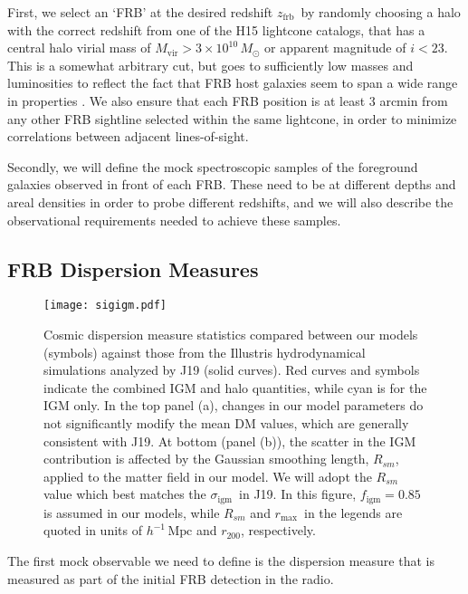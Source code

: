 \documentclass[twocolumn]{aastex63}
\newcommand{\dmhalo}{\ensuremath{\mathrm{DM}_\mathrm{halos}}}
\newcommand{\dmigm}{\ensuremath{\mathrm{DM}_\mathrm{igm}}}
\newcommand{\sigigm}{\ensuremath{\sigma_\mathrm{igm}}}
\newcommand{\figm}{\ensuremath{f_\mathrm{igm}}}
\newcommand{\zfrb}{\ensuremath{z_\mathrm{frb}}}
\newcommand{\hmpc}{\ensuremath{h^{-1}\,\mathrm{Mpc}}}
\newcommand{\rmax}{\ensuremath{r_\mathrm{max}}}
\begin{document}
\begin{CJK*}{UTF8}{gbsn}
First, we select an `FRB' at the desired redshift \zfrb\ by randomly choosing a halo with the correct redshift from one of the H15 lightcone catalogs,
that has a central halo virial mass of $M_\mathrm{vir} > 3 \times 10^{10}\,M_\odot$ or apparent magnitude of $i<23$. 
This is a somewhat arbitrary cut, but goes to sufficiently low masses and luminosities to reflect the fact that FRB host galaxies seem to span a wide range in properties \citep[e.g.][]{heintz:2020}.
We also ensure that each 
FRB position is at least 3 arcmin from any other FRB sightline selected within the same lightcone, 
in order to minimize correlations between adjacent lines-of-sight.

Secondly, we will define the mock spectroscopic samples of the foreground galaxies observed in front of each FRB.
These need to be at different depths and areal densities in order to probe different redshifts, and we will also describe the
observational requirements needed to achieve these samples.


\subsection{FRB Dispersion Measures}
\label{sec:dm_frb}

\begin{figure}
\texttt{[image: sigigm.pdf]}
\caption{\label{fig:sigigm}
Cosmic dispersion measure statistics compared between our models (symbols) against those from the Illustris hydrodynamical simulations analyzed by J19 (solid curves). Red curves and symbols indicate the combined IGM and halo quantities, while cyan is for the IGM only.
In the top panel (a), changes in our model parameters do not significantly modify the mean DM values, which are generally consistent with J19. 
At bottom (panel (b)), the scatter in the IGM contribution is affected by the Gaussian smoothing length, $R_{sm}$, applied to the matter field in our model. 
We will adopt the $R_{sm}$ value which best matches the \sigigm\ in J19.
In this figure, $\figm =0.85$ is assumed in our models, while $R_{sm}$ and \rmax\ in the legends are quoted in units of \hmpc{} and $r_{200}$, respectively.
}
\end{figure}

The first mock observable we need to define is the dispersion measure that is measured as part of the initial FRB detection in the radio.



\end{CJK*}
\end{document}

